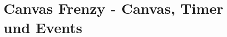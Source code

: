 \documentclass[a4paper, 12pt, hidelinks, listof=totoc, listoftables=totoc, bibliography=totoc]{scrreprt}
\begin{document}
%
%
%
%
%
%
%
%
%






\section{Canvas Frenzy - Canvas, Timer und Events}
\end{document}
